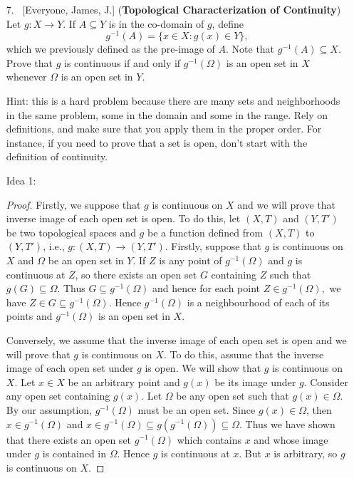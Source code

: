 \documentclass[10pt]{article}
\theoremstyle{definition}
\begin{document}
\begin{enumerate}

\item[7.]  ~[Everyone, James, J.] (\textbf{Topological Characterization of Continuity})  Let $g: X \to Y$.  If $A \subseteq Y$ is in the co-domain of $g$, define $$g^{-1}(A) = \{x \in X: g(x) \in Y \},$$ which we previously defined as the pre-image of $A$.  Note that $g^{-1}(A) \subseteq X$. Prove that $g$ is continuous if and only if $g^{-1}(\Omega)$ is an open set in $X$ whenever $\Omega$ is an open set in $Y$.

Hint: this is a hard problem because there are many sets and neighborhoods in the same problem, some in the domain and some in the range.  Rely on definitions, and make sure that you apply them in the proper order.  For instance, if you need to prove that a set is open, don't start with the definition of continuity.


Idea 1:
\begin{proof}
Firstly, we suppose that $g$ is continuous on $X$ and we will prove that inverse image of each open set is open.  To do this, let $(X,T)$ and $(Y,T')$ be two topological spaces and $g$ be a function defined from $(X,T)$ to $(Y,T')$, i.e., $g: (X,T) \rightarrow (Y,T')$. Firstly, suppose that $g$ is continuous on $X$ and $\Omega$ be an open set in $Y$.  If $Z$ is any point of $g^{-1}(\Omega)$ and $g$ is continuous at $Z$, so there exists an open set $G$ containing $Z$ such that $g(G) \subseteq \Omega$.  Thus $G \subseteq g^{-1}(\Omega)$ and hence for each point $Z \in g^{-1}(\Omega),$ we have $Z \in G \subseteq g^{-1}(\Omega)$.  Hence $g^{-1}(\Omega)$ is a neighbourhood of each of its points and $g^{-1}(\Omega)$ is an open set in $X$.

Conversely, we assume that the inverse image of each open set is open and we will prove that $g$ is continuous on $X$.  To do this, assume that the inverse image of each open set under $g$ is open.  We will show that $g$ is continuous on $X$.  Let $x \in X$ be an arbitrary point and $g(x)$ be its image under $g$.  Consider any open set containing $g(x)$.  Let $\Omega$ be any open set such that $g(x) \in \Omega$.  By our assumption, $g^{-1}(\Omega)$ must be an open set. Since $g(x) \in \Omega$, then $x \in g^{-1}(\Omega)$ and $x \in g^{-1}(\Omega) \subseteq g(g^{-1}(\Omega)) \subseteq \Omega$.  Thus we have shown that there exists an open set $g^{-1}(\Omega)$ which contains $x$ and whose image under $g$ is contained in $\Omega$.  Hence $g$ is continuous at $x$.  But $x$ is arbitrary, so $g$ is continuous on $X$. 
\end{proof}


\end{enumerate}
\end{document}
